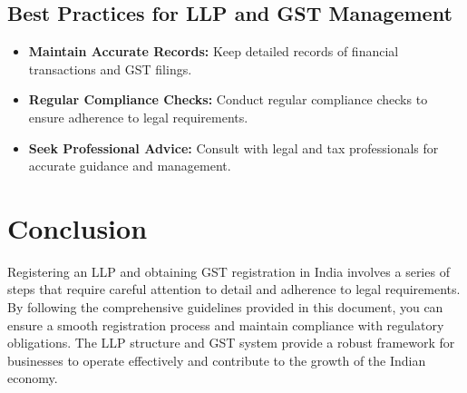 \documentclass{article}
\begin{document}
\section{Best Practices for LLP and GST Management}
\begin{itemize}
    \item \textbf{Maintain Accurate Records:} Keep detailed records of financial transactions and GST filings.
    \item \textbf{Regular Compliance Checks:} Conduct regular compliance checks to ensure adherence to legal requirements.
    \item \textbf{Seek Professional Advice:} Consult with legal and tax professionals for accurate guidance and management.
\end{itemize}

\chapter{Conclusion}
Registering an LLP and obtaining GST registration in India involves a series of steps that require careful attention to detail and adherence to legal requirements. By following the comprehensive guidelines provided in this document, you can ensure a smooth registration process and maintain compliance with regulatory obligations. The LLP structure and GST system provide a robust framework for businesses to operate effectively and contribute to the growth of the Indian economy.
\end{document}
